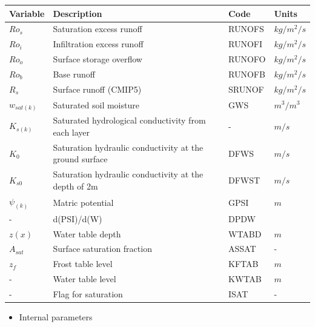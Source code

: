 \begin{longtable}[]{@{}llll@{}}
\toprule\noalign{}
Variable & Description & Code & Units \\
\midrule\noalign{}
\endhead
\bottomrule\noalign{}
\endlastfoot
\(Ro_s\) & Saturation excess runoff & RUNOFS & \(kg/m^2/s\) \\
\(Ro_i\) & Infiltration excess runoff & RUNOFI & \(kg/m^2/s\) \\
\(Ro_o\) & Surface storage overflow & RUNOFO & \(kg/m^2/s\) \\
\(Ro_b\) & Base runoff & RUNOFB & \(kg/m^2/s\) \\
\(R_s\) & Surface runoff (CMIP5) & SRUNOF & \(kg/m^2/s\) \\
\(w_{sat(k)}\) & Saturated soil moisture & GWS & \(m^3/m^3\) \\
\(K_{s(k)}\) & Saturated hydrological conductivity from each layer & - & \(m/s\) \\
\(K_0\) & Saturation hydraulic conductivity at the ground surface & DFWS & \(m/s\) \\
\(K_{s0}\) & Saturation hydraulic conductivity at the depth of 2m & DFWST & \(m/s\) \\
\(\psi_{(k)}\) & Matric potential & GPSI & \(m\) \\
- & d(PSI)/d(W) & DPDW & \\
\(z(x)\) & Water table depth & WTABD & \(m\) \\
\(A_{sat}\) & Surface saturation fraction & ASSAT & - \\
\(z_f\) & Frost table level & KFTAB & \(m\) \\
- & Water table level & KWTAB & \(m\) \\
- & Flag for saturation & ISAT & - \\
\end{longtable}

\begin{itemize}
\tightlist
\item
  Internal parameters
\end{itemize}

